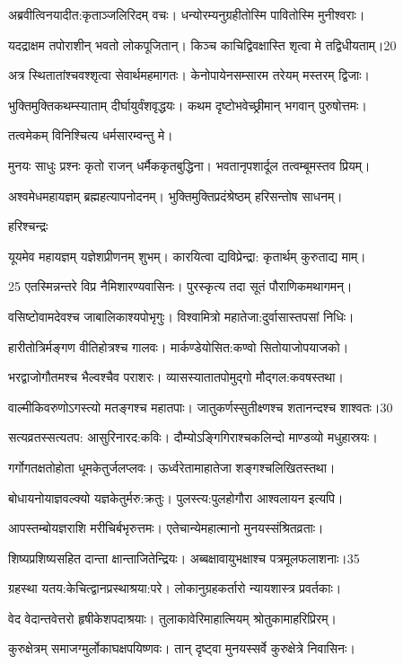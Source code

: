 अब्रवीत्विनयादीत:कृताञ्जलिरिदम् वचः।
धन्योरम्यनुग्रहीतोस्मि पावितोस्मि मुनीश्वराः।

यदद्राक्षम तपोराशीन् भवतो लोकपूजितान्।
किञ्च काचिद्विवक्षास्ति शृत्वा मे तद्विधीयताम्।20

अत्र स्थितातांश्चवश्शृत्वा सेवार्थमहमागतः।
केनोपायेनसम्सारम तरेयम् मस्तरम् द्विजाः।

भुक्तिमुक्तिकथम्स्याताम् दीर्घायुर्वंशवृद्धयः।
कथम दृष्टोभवेच्छ्रीमान् भगवान् पुरुषोत्तमः।

तत्वमेकम् विनिश्चित्य धर्मसारम्वन्तु मे।

मुनयः
साधुः प्रश्नः कृतो राजन् धर्मैककृतबुद्धिना।
भवतानृपशार्दूल तत्वम्बूमस्तव प्रियम्।

अश्वमेधमहायज्ञम् ब्रह्महत्यापनोदनम्।
भुक्तिमुक्तिप्रदंश्रेष्ठम् हरिसन्तोष साधनम्।

हरिश्चन्द्रः

यूयमेव महायज्ञम् यज्ञेशप्रीणनम् शुभम्।
कारयित्वा द्यविप्रेन्द्रा: कृतार्थम् कुरुताद्य माम्।

25 एतस्मिन्नन्तरे विप्र नैमिशारण्यवासिनः।
पुरस्कृत्य तदा सूतं पौराणिकमथागमन्।

वसिष्टोवामदेवश्च जाबालिकाश्यपोभृगुः।
विश्वामित्रो महातेजा:दुर्वासास्तपसां निधिः।

हारीतोत्रिर्मङ्गण वीतिहोत्रश्च गालवः।
मार्कण्डेयोसित:कण्वो सितोयाजोपयाजको।

भरद्वाजोगौतमश्च भैल्वश्चैव पराशरः।
व्यासस्यातातपोमुद्गो मौद्गल:कवषस्तथा।

वाल्मीकिवरुणोऽगस्त्यो मतङ्गश्च महातपाः।
जातुकर्णस्सुतीक्ष्णश्च शतानन्दश्च शाश्वतः।30

सत्यव्रतस्सत्यतप: आसुरिनारद:कविः।
दौम्योऽङ्गिगिराश्चकलिन्दो माण्डव्यो मधुहास्रयः।

गर्गोगतक्षतोहोता धूमकेतुर्जलप्लवः।
ऊर्ध्वरेतामाहातेजा शङ्गश्चलिखितस्तथा।

बोधायनोयाज्ञवल्क्यो यज्ञकेतुर्मरु:क्रतुः।
पुलस्त्य:पुलहोगौरा आश्वलायन इत्यपि।

आपस्तम्बोयज्ञराशि मरीचिर्बभृरुत्तमः।
एतेचान्येमहात्मानो मुनयस्संश्रितव्रताः।

शिष्यप्रशिष्यसहित दान्ता क्षान्ताजितेन्द्रियः।
अब्बक्षावायुभक्षाश्च पत्रमूलफलाशनाः।35

ग्रहस्था यतय:केचित्द्वानप्रस्थाश्रया:परे।
लोकानुग्रहकर्तारो न्यायशास्त्र प्रवर्तकाः।

वेद वेदान्तवेत्तरो हृषीकेशपदाश्रयाः।
तुलाकावेरिमाहात्मियम् श्रोतुकामाहरिप्रिरम्।

कुरुक्षेत्रम् समाजग्मुर्लोकाघक्षपयिष्णवः।
तान् दृष्ट्वा मुनयस्सर्वे कुरुक्षेत्रे निवासिनः।

